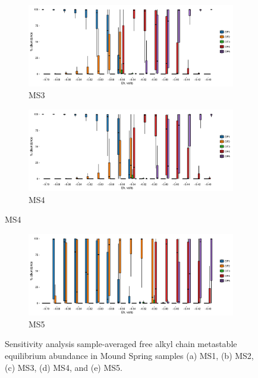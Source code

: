 {\begin{figure}[h]
    \begin{subfigure}[b]{\linewidth}
       	\includegraphics[width=1\linewidth]{"figs_app2/boxplot_ggplot_02bin Mound OF3 iter 999"}
       	\caption{MS3}
        \label{fig:MS3_mc}
    \end{subfigure}
    \begin{subfigure}[b]{\linewidth}
    	\includegraphics[width=1\linewidth]{"figs_app2/boxplot_ggplot_02bin Mound OF4 iter 999"}
    	\caption{MS4}
        \label{fig:MS4_mc}
    \end{subfigure}
    
\end{figure}

\newpage

\begin{figure}[h]\ContinuedFloat

    \begin{subfigure}[b]{\linewidth}
    	\includegraphics[width=\linewidth]{"figs_app2/boxplot_ggplot_02bin Mound OF5 iter 999"}
    	\caption{MS5}
        \label{fig:MS5_mc}
    \end{subfigure}
    
    \caption[Sensitivity analysis sample-averaged free alkyl chain metastable equilibrium abundance in Mound Spring samples]{Sensitivity analysis sample-averaged free alkyl chain metastable equilibrium abundance in Mound Spring samples (a) MS1, (b) MS2, (c) MS3, (d) MS4, and (e) MS5.}
    \label{fig:mound_mc}
\end{figure}
\doublespace
\clearpage
}



